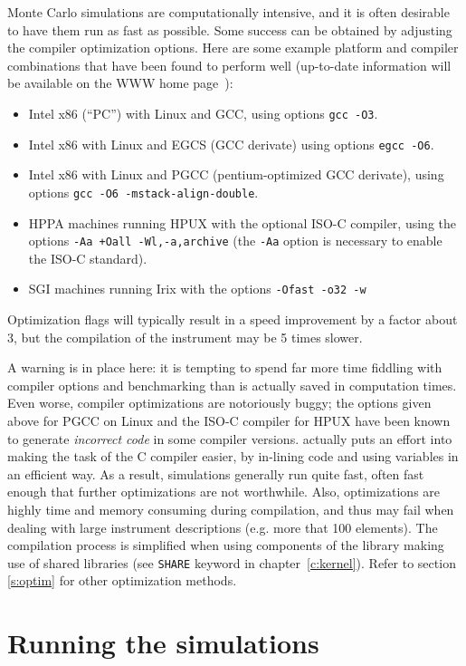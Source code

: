 Monte Carlo simulations are computationally intensive, and it is often desirable
to have them run as fast as possible. Some success can be obtained by adjusting
the compiler optimization options. Here are some example platform and compiler
combinations that have been found to perform well (up-to-date information will
be available on the \MCS WWW home page~\cite{mcstas_webpage}):
\begin{itemize}
\item Intel x86 (``PC'') with Linux and GCC, using options \verb+gcc -O3+.
\item Intel x86 with Linux and EGCS (GCC derivate) using
  options \verb+egcc -O6+.
\item Intel x86 with Linux and PGCC (pentium-optimized GCC derivate), using
  options \verb+gcc -O6 -mstack-align-double+.
\item HPPA machines running HPUX with the optional ISO-C compiler,
  using the options
  \verb|-Aa +Oall -Wl,-a,archive| (the \verb+-Aa+ option is necessary to
  enable the ISO-C standard).
\item SGI machines running Irix with the options
  \verb|-Ofast -o32 -w|
\end{itemize}
Optimization flags will typically result in a speed improvement by a factor
about 3, but the compilation of the instrument may be 5 times slower.

A warning is in place here: it is tempting to spend far more time fiddling with
compiler options and benchmarking than is actually saved in computation
times. Even worse, compiler optimizations are notoriously buggy; the options
given above for PGCC on Linux and the ISO-C compiler for HPUX have been known to
generate \emph{incorrect code} in some compiler versions. \mcs actually puts an
effort into making the task of the C compiler easier, by in-lining code and
using variables in an efficient way. As a result, \MCS simulations generally
run quite fast, often fast enough that further optimizations are not
worthwhile. Also, optimizations are highly time and memory consuming during
compilation, and thus may fail when dealing with large instrument descriptions
(e.g. more that 100 elements). The compilation process is simplified when using
components of the library making use of shared libraries (see \verb+SHARE+
keyword in chapter~\ref{c:kernel}). Refer to section \ref{s:optim} for other
optimization methods.

\section{Running the simulations}
\label{s:run-sim}

